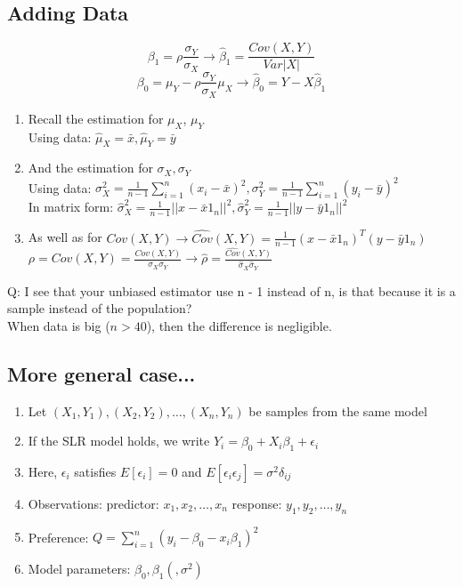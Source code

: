 \documentclass[11pt]{article}
\theoremstyle{definition}
\begin{document}
\subsection*{Adding Data}
$$\beta_1 = \rho\frac{\sigma_Y}{\sigma_X} \rightarrow \hat{\beta}_1 = \frac{Cov(X, Y)}{Var|X|}$$
$$\beta_0 = \mu_Y - \rho\frac{\sigma_Y}{\sigma_X}\mu_X \rightarrow \hat{\beta}_0 = Y - X\hat{\beta}_1$$
\begin{enumerate}
\item Recall the estimation for $\mu_X$, $\mu_Y$\\
\qquad Using data: $\hat{\mu}_X = \bar{x}, \hat{\mu}_Y = \bar{y}$
\item And the estimation for $\sigma_X, \sigma_Y$\\
\qquad Using data: $\sigma_X^2 = \frac{1}{n - 1}\sum_{i = 1}^n (x_i - \bar{x})^2, \sigma_Y^2 = \frac{1}{n - 1}\sum_{i = 1}^n (y_i - \bar{y})^2$\\
\qquad In matrix form: $\hat{\sigma}_X^2 = \frac{1}{n - 1}||x - \bar{x}1_n||^2, \hat{\sigma}_Y^2 = \frac{1}{n - 1}||y - \bar{y}1_n||^2$
\item As well as for $Cov(X, Y) \rightarrow \hat{Cov}(X, Y) = \frac{1}{n - 1}(x - \bar{x}1_n)^T(y - \bar{y}1_n)$\\
\qquad $\rho = Cov(X, Y) = \frac{Cov(X, Y)}{\sigma_X\sigma_Y} \rightarrow \hat{\rho} = \frac{\hat{Cov}(X, Y)}{\hat{\sigma}_X\hat{\sigma}_Y}$
\end{enumerate}
Q: I see that your unbiased estimator use n - 1 instead of n, is that because it is a sample instead of the population?\\
When data is big ($n > 40$), then the difference is negligible.

\subsection*{More general case...}
\begin{enumerate}
\item Let $(X_1, Y_1), (X_2, Y_2), \dots, (X_n, Y_n)$ be samples from the same model
\item If the SLR model holds, we write $Y_i = \beta_0 + X_i\beta_1 + \epsilon_i$
\item Here, $\epsilon_i$ satisfies $E[\epsilon_i] = 0$ and $E[\epsilon_i\epsilon_j] = \sigma^2\delta_{ij}$
\item Observations: predictor: $x_1, x_2, \dots, x_n$ \qquad response: $y_1, y_2, \dots, y_n$
\item Preference: $Q = \sum_{i = 1}^n (y_i - \beta_0 - x_i\beta_1)^2$
\item Model parameters: $\beta_0, \beta_1(, \sigma^2)$
\end{enumerate}
\end{document}
